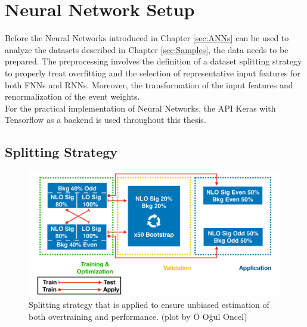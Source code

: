 \chapter{Neural Network Setup}
\label{sec:NNSetup}

Before the Neural Networks introduced in Chapter \ref{sec:ANNs} can be used to analyze the datasets described in Chapter \ref{sec:Samples}, the data needs to be prepared. The preprocessing involves the definition of a dataset splitting strategy to properly treat overfitting and the selection of representative input features for both FNNs and RNNs. Moreover, the transformation of the input features and renormalization of the event weights. \\
For the practical implementation of Neural Networks, the API Keras with Tensorflow as a backend is used throughout this thesis. 


\section{Splitting Strategy}
\label{sec:splitting}

\begin{figure}[H]
\includegraphics[width=\linewidth , left]{figs/splitting.pdf}
\caption{Splitting strategy that is applied to ensure unbiased estimation of both overtraining and performance. (plot by \"O O\u{g}ul Oncel)}
\label{fig:splitting}
\end{figure}

